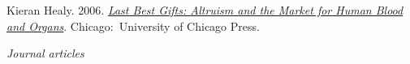 \documentclass[11pt]{article}
\begin{document}
\ind  Kieran Healy. 2006. \emph{\href{http://www.lastbestgifts.com}{Last Best Gifts: Altruism and the Market for Human Blood and Organs}}. Chicago:~University of Chicago Press. \vspace{-0.075in}


\normalsize

\bigskip
\noindent\emph{Journal articles \vspace{0.05in}}
 
\end{document}
